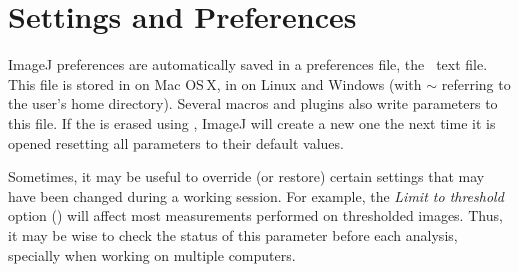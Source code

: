 \section[Settings and Preferences]{Settings and Preferences\label{sec:Settings-and-Preferences}\improvement{}}

ImageJ
preferences are automatically saved in a preferences file, the\texttt{
} text file. This file is stored in 
on Mac OS\,X, in  on Linux and Windows
(with $\sim$ referring to the user's home directory). Several macros
and plugins also write parameters to this file. If the 
is erased using ,
ImageJ will create a new one the next time it is opened resetting
all parameters to their default values. 

Sometimes, it may be useful to override (or restore) certain settings
that may have been changed during a working session. For example,
the \emph{Limit to threshold} option ()
will affect most measurements performed on thresholded images. Thus,
it may be wise to check the status of this parameter before each analysis,
specially when working on multiple computers.

